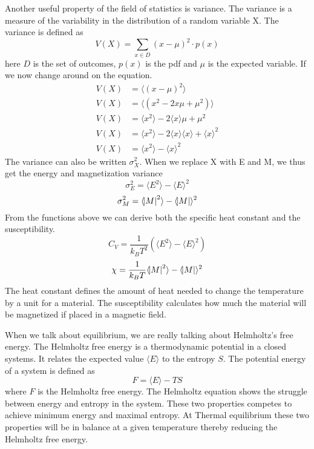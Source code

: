 \documentclass{article}
\begin{document}
Another useful property of the field of statistics is variance. The variance is a measure of the variability in the distribution of a random variable X. The variance is defined as
$$V(X) = \sum_{x \in D}(x - \mu)^2 \cdot p(x)$$
here $D$ is the set of outcomes, $p(x)$ is the pdf and $\mu$ is the expected variable. If we now change around on the equation.
\begin{align}
    V(X) & = \langle (x - \mu)^2 \rangle \\
    V(X) & = \langle (x^2 - 2x \mu + \mu^2)\rangle \\
    V(X) & = \langle x^2 \rangle - 2\langle x \rangle \mu + \mu^2 \\
    V(X) & = \langle x^2 \rangle - 2 \langle x \rangle \langle x \rangle + \langle x \rangle^2 \\
    V(X) & = \langle x^2 \rangle - \langle x \rangle^2
\end{align}
The variance can also be written $\sigma^{2}_{X}$. When we replace X with E and M, we thus get the energy and magnetization variance
$$\sigma_{E}^{2} = \langle E^2 \rangle - \langle E \rangle^2$$
$$\sigma_{M}^{2} = \langle \abs{M}^2 \rangle - \langle \abs{M} \rangle^2$$
From the functions above we can derive both the specific heat constant and the susceptibility.
$$C_{V} = \frac{1}{k_{B}T^2}(\langle E^2 \rangle - \langle E \rangle^2)$$
$$\chi = \frac{1}{k_{B}T}\langle \abs{M}^2 \rangle - \langle \abs{M} \rangle^2$$
The heat constant defines the amount of heat needed to change the temperature by a unit for a material.
The susceptibility calculates how much the material will be magnetized if placed in a magnetic field.
\newline

\noindent When we talk about equilibrium, we are really talking about Helmholtz's free energy. The Helmholtz free energy is a thermodynamic potential in a closed systems. It relates the expected value $\langle E \rangle$ to the entropy $S$. The potential energy of a system is defined as
$$F=\langle E\rangle-TS$$
where $F$ is the Helmholtz free energy. The Helmholtz equation shows the struggle between energy and entropy in the system. These two properties competes to achieve minimum energy and maximal entropy. At Thermal equilibrium these two properties will be in balance at a given temperature thereby reducing the Helmholtz free energy.
\end{document}
